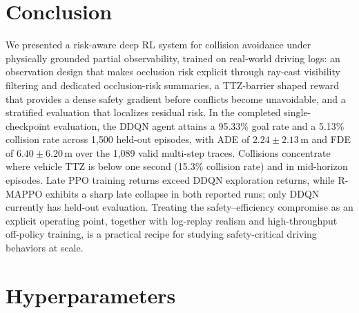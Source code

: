 \documentclass{article}
\begin{document}
\section{Conclusion}
\label{sec:conclusion}

We presented a risk-aware deep RL system for collision avoidance under
physically grounded partial observability, trained on real-world driving
logs: an observation design that makes occlusion risk explicit through
ray-cast visibility filtering and dedicated occlusion-risk summaries, a
TTZ-barrier shaped reward that provides a dense safety gradient before
conflicts become unavoidable, and a stratified evaluation that localizes
residual risk. In the completed single-checkpoint evaluation, the DDQN agent
attains a 95.33\% goal rate and a 5.13\% collision rate across 1{,}500
held-out episodes, with ADE of $2.24 \pm 2.13$\,m and FDE of
$6.40 \pm 6.20$\,m over the 1{,}089 valid multi-step traces. Collisions
concentrate where vehicle TTZ is below one second (15.3\% collision rate)
and in mid-horizon episodes. Late PPO training returns exceed DDQN
exploration returns, while R-MAPPO exhibits a sharp late collapse in both
reported runs; only DDQN currently has held-out evaluation. Treating the
safety--efficiency compromise as an explicit operating point, together with
log-replay realism and high-throughput off-policy training, is a practical
recipe for studying safety-critical driving behaviors at scale.




\appendix

\section{Hyperparameters}
\label{app:hyper}
\end{document}

